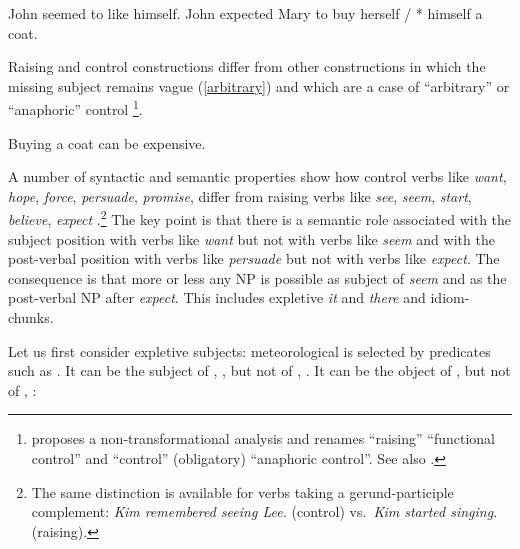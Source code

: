 \eal
\ex John seemed to like himself.\label{ex-john-seemed-to-like-himself}
\ex John expected Mary to buy herself / * himself a coat. \label{exp}
\zl
 
Raising and control constructions differ from other constructions in which the missing subject
remains vague (\ref{arbitrary}) and which are a case of ``arbitrary'' or ``anaphoric'' control
\parencites[--76]{Chomsky1981}[]{Bresnan1982}\footnote{\citet{Bresnan1982} proposes
  a non-transformational analysis and renames ``raising'' ``functional control'' and ``control''
  (obligatory) ``anaphoric control''. See also .}. 
 
\ea
Buying a coat can be expensive.\label{arbitrary}
\z
  
A number of syntactic and semantic properties show how control verbs like \emph{want}, \emph{hope},
\emph{force}, \emph{persuade}, \emph{promise}, differ from raising verbs like \emph{see},
\emph{seem}, \emph{start}, \emph{believe}, \emph{expect} \citep{Rosenbaum67a-u,Postal1974,Bresnan1982}.\footnote{%
  The same distinction is available for verbs taking a gerund-participle complement: 
  \emph{Kim remembered seeing Lee.} (control) vs.\  \emph{Kim started singing.} (raising).%
}
The key point is that there is a semantic role associated with the subject position with verbs like
\emph{want} but not with verbs like \emph{seem} and with the post-verbal position with verbs like
\emph{persuade} but not with verbs like \emph{expect}.  The consequence is that more or less any NP
is possible as subject of \emph{seem} and as the post-verbal NP after \emph{expect}. This includes
expletive \emph{it} and \emph{there} and idiom-chunks.

    Let us first consider expletive subjects: meteorological  is selected by predicates
such as . It can be the subject of , , but not of ,
. It can be the object of ,  but not of ,
:
	
